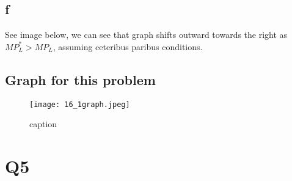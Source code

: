 \documentclass[12pt]{article}
\begin{document}
\subsection*{f}
See image below, we can see that graph shifts outward towards the right as $MP^*_L > MP_L$, assuming ceteribus paribus conditions. 
\subsection*{Graph for this problem}
\begin{figure}[H]
    \centering
    \texttt{[image: 16\_1graph.jpeg]}
    \caption{caption}
    \label{fig:enter-label}
\end{figure}
\section*{Q5}
\end{document}
